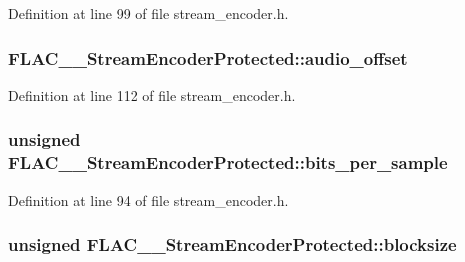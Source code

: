 Definition at line 99 of file stream\+\_\+encoder.\+h.

\subsubsection[{\texorpdfstring{audio\+\_\+offset}{audio_offset}}]{ F\+L\+A\+C\+\_\+\+\_\+\+Stream\+Encoder\+Protected\+::audio\+\_\+offset}\hypertarget{struct_f_l_a_c_____stream_encoder_protected_a306d71678065f5aceeef636bb1edca6c}{}\label{struct_f_l_a_c_____stream_encoder_protected_a306d71678065f5aceeef636bb1edca6c}


Definition at line 112 of file stream\+\_\+encoder.\+h.

\subsubsection[{\texorpdfstring{bits\+\_\+per\+\_\+sample}{bits_per_sample}}]{\setlength{\rightskip}{0pt plus 5cm}unsigned F\+L\+A\+C\+\_\+\+\_\+\+Stream\+Encoder\+Protected\+::bits\+\_\+per\+\_\+sample}\hypertarget{struct_f_l_a_c_____stream_encoder_protected_aa6b763ddfadc2d9fc188a6f7367672e6}{}\label{struct_f_l_a_c_____stream_encoder_protected_aa6b763ddfadc2d9fc188a6f7367672e6}


Definition at line 94 of file stream\+\_\+encoder.\+h.

\subsubsection[{\texorpdfstring{blocksize}{blocksize}}]{\setlength{\rightskip}{0pt plus 5cm}unsigned F\+L\+A\+C\+\_\+\+\_\+\+Stream\+Encoder\+Protected\+::blocksize}\hypertarget{struct_f_l_a_c_____stream_encoder_protected_a0b244b1c73b4675189b8ad0b61f6fbf7}{}\label{struct_f_l_a_c_____stream_encoder_protected_a0b244b1c73b4675189b8ad0b61f6fbf7}


